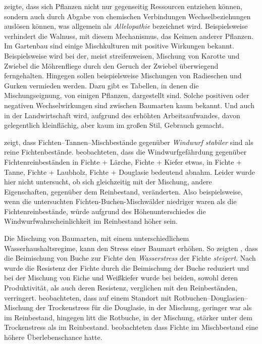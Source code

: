\documentclass[twocolumn]{scrartcl}
\begin{document}
\cite{molisch1937allelopathie} zeigte, dass sich Pflanzen nicht nur
gegenseitig Ressourcen entziehen können, sondern auch durch Abgabe von
chemischen Verbindungen Wechselbeziehungen auslösen können, was
allgemein als \emph{Allelopathie} bezeichnet wird. Beispielsweise
verhindert die Walnuss, mit diesem Mechanismus, das Keimen anderer
Pflanzen. Im Gartenbau sind einige Mischkulturen mit positive
Wirkungen bekannt. Beispielsweise wird bei der, meist streifenweisen,
Mischung von Karotte und Zwiebel die Möhrenfliege durch den Geruch der
Zwiebel überwiegend ferngehalten. Hingegen sollen beispielsweise
Mischungen von Radieschen und Gurken vermieden werden. Dazu gibt es
Tabellen, in denen die Mischungseignung, von einigen Pflanzen,
dargestellt sind. Solche positiven oder negativen Wechselwirkungen
sind zwischen Baumarten kaum bekannt. Und auch in der Landwirtschaft
wird, aufgrund des erhöhten Arbeitsaufwandes, davon gelegentlich
kleinflächig, aber kaum im großen Stil, Gebrauch gemacht.

\cite{schmidtVogt1987Sturmstabilitaet} zeigt, dass
Fichten--Tannen--Mischbestände gegenüber \emph{Windwurf stabiler} sind
als reine Fichtenbestände. \cite{schuetz2006stabilitaetMischbestand}
beobachteten, dass die Windwurfgefährdung gegenüber
Fichtenreinbeständen in Fichte + Lärche, Fichte + Kiefer etwas, in
Fichte + Tanne, Fichte + Laubholz, Fichte + Douglasie bedeutend
abnahm. Leider wurde hier nicht untersucht, ob sich gleichzeitig mit
der Mischung, andere Eigenschaften, gegenüber dem Reinbestand,
veränderten. Also beispielsweise, wenn die untersuchten
Fichten-Buchen-Mischwälder niedriger waren als die
Fichtenreinbestände, würde aufgrund des Höhenunterschiedes die
Windwurfwahrscheinlichkeit im Reinbestand höher sein.

Die Mischung von Baumarten, mit einem unterschiedlichem
Wasserhaushaltsregime, kann den Stress einer Baumart erhöhen. So
zeigten \cite{schume2004wasserFichteBuche}, dass die Beimischung von
Buche zur Fichte den \emph{Wasserstress} der Fichte
\emph{steigert}. Nach \cite{nothdurft2020mischbestand} wurde die
Resistenz der Fichte durch die Beimischung der Buche reduziert und bei
der Mischung von Eiche und Weißkiefer wurde bei beiden, sowohl deren
Produktivität, als auch deren Resistenz, verglichen mit den
Reinbeständen, verringert. \cite{thurm2016mischungDougBuStress}
beobachteten, dass auf einem Standort mit
Rotbuchen--Douglasien--Mischung der Trockenstress für die Douglasie,
in der Mischung, geringer war als im Reinbestand, hingegen litt die
Rotbuche, in der Mischung, stärker unter dem Trockenstress als im
Reinbestand. \cite{neuner2015FichteAusfall} beobachteten dass Fichte
im Mischbestand eine höhere Überlebenschance hatte.
\end{document}

